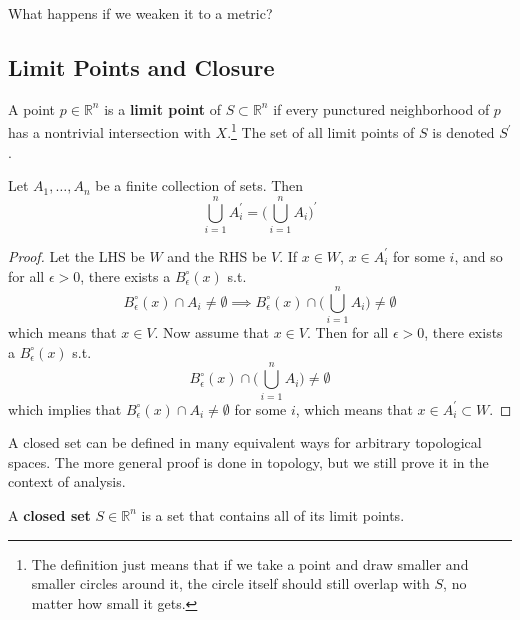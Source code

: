  What happens if we weaken it to a metric? 

\subsection{Limit Points and Closure} 

  \begin{definition}
    A point $p \in \mathbb{R}^n$ is a \textbf{limit point} of $S \subset \mathbb{R}^n$ if every punctured neighborhood of $p$ has a nontrivial intersection with $X$.\footnote{The definition just means that if we take a point and draw smaller and smaller circles around it, the circle itself should still overlap with $S$, no matter how small it gets. } The set of all limit points of $S$ is denoted $S^\prime$. 
  \end{definition}

  \begin{theorem}
    Let $A_1, \ldots, A_n$ be a finite collection of sets. Then 
    \[\bigcup_{i=1}^n A_i^\prime = \bigg( \bigcup_{i=1}^n A_i \bigg)^\prime\]
  \end{theorem}
  \begin{proof}
    Let the LHS be $W$ and the RHS be $V$. If $x \in W$, $x \in A_i^\prime$ for some $i$, and so for all $\epsilon > 0$, there exists a $B_\epsilon^\circ (x)$ s.t. 
    \[B_\epsilon^\circ (x) \cap A_i \neq \emptyset \implies B_\epsilon^\circ (x) \cap \bigg( \bigcup_{i=1}^n A_i \bigg) \neq \emptyset\]
    which means that $x \in V$. Now assume that $x \in V$. Then for all $\epsilon > 0$, there exists a $B_\epsilon^\circ (x)$ s.t. 
    \[B_\epsilon^\circ (x) \cap \bigg( \bigcup_{i=1}^n A_i \bigg) \neq \emptyset\]
    which implies that $B_\epsilon^\circ (x) \cap A_i \neq \emptyset$ for some $i$, which means that $x \in A_i^\prime \subset W$. 
  \end{proof}

  A closed set can be defined in many equivalent ways for arbitrary topological spaces. The more general proof is done in topology, but we still prove it in the context of analysis. 

  \begin{definition}
    A \textbf{closed set} $S \in \mathbb{R}^n$ is a set that contains all of its limit points. 
  \end{definition}

